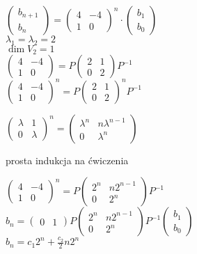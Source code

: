 $\begin{pmatrix} 
    b_{n+1} \\ b_n
    \end{pmatrix} = \begin{pmatrix} 4 & -4 \\ 1 & 0 \end{pmatrix}^n \cdot \begin{pmatrix} b_1 \\ b_0
    \end{pmatrix}$ \\ 
$\lambda_1 = \lambda_2 = 2$\\ 
$ \dim V_2 = 1$ \\ 
$\begin{pmatrix} 4 & -4 \\ 1 & 0 \end{pmatrix} = P \begin{pmatrix} 2 & 1 \\ 0 & 2 \end{pmatrix} P^{-1}$ \\ 
$\begin{pmatrix} 4 & -4 \\ 1 & 0 \end{pmatrix}^n = P \begin{pmatrix} 2 & 1 \\ 0 & 2 \end{pmatrix}^n P^{-1}$ 
\begin{lem}
    $ \begin{pmatrix} \lambda & 1 \\ 0 & \lambda \end{pmatrix}^n = \begin{pmatrix} \lambda^n & n\lambda^{n-1} \\ 
    0 & \lambda^n \end{pmatrix}$ 
\begin{dd} 
    prosta indukcja na ćwiczenia
\end{dd} 
\end{lem} 
$\begin{pmatrix} 4 & -4 \\ 1 & 0 \end{pmatrix}^n = P \begin{pmatrix} 2^n & n2^{n-1} \\ 0 & 2^n 
\end{pmatrix} P^{-1}$ \\ 
$b_n = \begin{pmatrix} 0 & 1 \end{pmatrix} P \begin{pmatrix} 2^n & n2^{n-1} \\ 0 & 2^n \end{pmatrix} P^{-1} 
\begin{pmatrix} b_1 \\ b_0 \end{pmatrix}$ \\ 
$b_n = c_1 2^n + \frac{c_2}{2} n 2^n$
